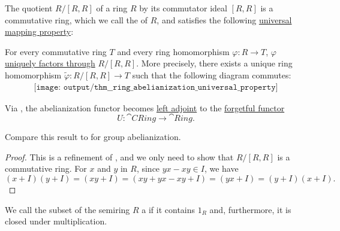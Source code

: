 \begin{theorem}\label{thm:ring_abelianization_universal_property}
  The quotient \( R / [R, R] \) of a ring \( R \) by its commutator ideal \( [R, R] \) is a commutative ring, which we call the  of \( R \), and satisfies the following \hyperref[rem:universal_mapping_property]{universal mapping property}:
  \begin{displayquote}
    For every commutative ring \( T \) and every ring homomorphism \( \varphi: R \to T \), \( \varphi \) \hyperref[def:factors_through]{uniquely factors through} \( R / [R, R] \). More precisely, there exists a unique ring homomorphism \( \widetilde{\varphi}: R / [R, R] \to T \) such that the following diagram commutes:
    \begin{equation}\label{eq:thm:ring_abelianization_universal_property/diagram}
      \begin{aligned}
        \texttt{[image: output/thm\_\_ring\_abelianization\_universal\_property]}
      \end{aligned}
    \end{equation}
  \end{displayquote}
\end{theorem}
\begin{comments}
  \item Via , the abelianization functor becomes \hyperref[def:category_adjunction]{left adjoint} to the \hyperref[def:concrete_category]{forgetful functor}
  \begin{equation*}
    U: \cat{CRing} \to \cat{Ring}.
  \end{equation*}
  \item Compare this result to  for group abelianization.
\end{comments}
\begin{proof}
  This is a refinement of , and we only need to show that \( R / [R, R] \) is a commutative ring. For \( x \) and \( y \) in \( R \), since \( yx - xy \in I \), we have
  \begin{equation*}
    (x + I) (y + I)
    =
    (xy + I)
    =
    (xy + yx - xy + I)
    =
    (yx + I)
    =
    (y + I) (x + I).
  \end{equation*}
\end{proof}

\begin{definition}\label{def:multiplicative_set_in_semiring}
  We call the subset of the semiring \( R \) a  if it contains \( 1_R \) and, furthermore, it is closed under multiplication.
\end{definition}

